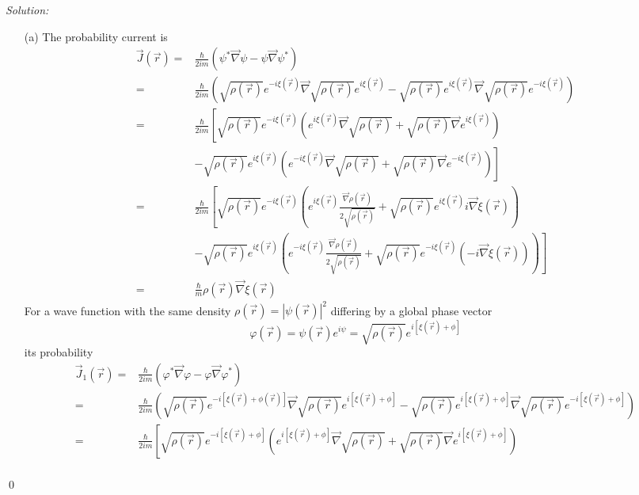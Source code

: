 \documentclass[12pt,a4paper]{article}
\newenvironment{sol}
    {\emph{Solution:}
    }
    {
    \qed
    }
\begin{document}
\begin{sol}
\begin{itemize}
\item[(a)] The probability current is
\begin{align}
\nonumber\vec{J}(\vec{r})=&\frac{\hbar}{2im}(\psi^*\vec{\nabla}\psi-\psi\vec{\nabla}\psi^*)\\
\nonumber=&\frac{\hbar}{2im}\left(\sqrt{\rho(\vec{r})}e^{-i\xi(\vec{r})}\vec{\nabla}\sqrt{\rho(\vec{r})}e^{i\xi(\vec{r})}-\sqrt{\rho(\vec{r})}e^{i\xi(\vec{r})}\vec{\nabla}\sqrt{\rho(\vec{r})}e^{-i\xi(\vec{r})}\right)\\
\nonumber=&\frac{\hbar}{2im}\left[\sqrt{\rho(\vec{r})}e^{-i\xi(\vec{r})}\left(e^{i\xi(\vec{r})}\vec{\nabla}\sqrt{\rho(\vec{r})}+\sqrt{\rho(\vec{r})}\vec{\nabla}e^{i\xi(\vec{r})}\right)\right.\\
\nonumber&\left.-\sqrt{\rho(\vec{r})}e^{i\xi(\vec{r})}\left(e^{-i\xi(\vec{r})}\vec{\nabla}\sqrt{\rho(\vec{r})}+\sqrt{\rho(\vec{r})}\vec{\nabla}e^{-i\xi(\vec{r})}\right)\right]\\
\nonumber=&\frac{\hbar}{2im}\left[\sqrt{\rho(\vec{r})}e^{-i\xi(\vec{r})}\left(e^{i\xi(\vec{r})}\frac{\vec{\nabla}\rho(\vec{r})}{2\sqrt{\rho(\vec{r})}}+\sqrt{\rho(\vec{r})}e^{i\xi(\vec{r})}i\vec{\nabla}\xi(\vec{r})\right)\right.\\
\nonumber&\left.-\sqrt{\rho(\vec{r})}e^{i\xi(\vec{r})}\left(e^{-i\xi(\vec{r})}\frac{\vec{\nabla}\rho(\vec{r})}{2\sqrt{\rho(\vec{r})}}+\sqrt{\rho(\vec{r})}e^{-i\xi(\vec{r})}(-i\vec{\nabla}\xi(\vec{r}))\right)\right]\\
=&\frac{\hbar}{m}\rho(\vec{r})\vec{\nabla}\xi(\vec{r})
\end{align}
For a wave function with the same density $\rho(\vec{r})=|\psi(\vec{r})|^2$ differing by a global phase vector
\begin{equation}
\varphi(\vec{r})=\psi(\vec{r})e^{i\psi}=\sqrt{\rho(\vec{r})}e^{i[\xi(\vec{r})+\phi]}
\end{equation}
its probability
\begin{align}
\nonumber\vec{J}_1(\vec{r})=&\frac{\hbar}{2im}(\varphi^*\vec{\nabla}\varphi-\varphi\vec{\nabla}\varphi^*)\\
\nonumber=&\frac{\hbar}{2im}\left(\sqrt{\rho(\vec{r})}e^{-i[\xi(\vec{r})+\phi(\vec{r})]}\vec{\nabla}\sqrt{\rho(\vec{r})}e^{i[\xi(\vec{r})+\phi]}-\sqrt{\rho(\vec{r})}e^{i[\xi(\vec{r})+\phi]}\vec{\nabla}\sqrt{\rho(\vec{r})}e^{-i[\xi(\vec{r})+\phi]}\right)\\
\nonumber=&\frac{\hbar}{2im}\left[\sqrt{\rho(\vec{r})}e^{-i[\xi(\vec{r})+\phi]}\left(e^{i[\xi(\vec{r})+\phi]}\vec{\nabla}\sqrt{\rho(\vec{r})}+\sqrt{\rho(\vec{r})}\vec{\nabla}e^{i[\xi(\vec{r})+\phi]}\right)\right.\\

\end{align}
\end{itemize}
\end{sol}
\end{document}
